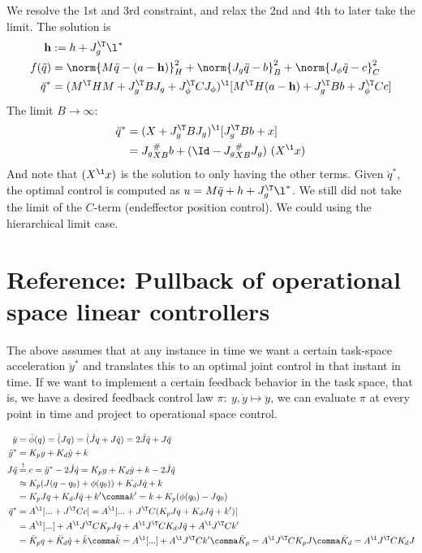 \documentclass[10pt,fleqn,twoside]{article}
\newcommand{\bh}{{\mathbf{h}}}
\begin{document}
We resolve the 1st and 3rd constraint, and relax the 2nd and 4th to
later take the limit. The solution is
\begin{align}
\bh
&:= h+J_g^\T\l^*  \\
f(\ddot q)
&=\norm{M\ddot q - (a-\bh)}^2_H
 + \norm{J_g \ddot q - b}^2_B
 + \norm{J_\phi \ddot q - c}^2_C \\
\ddot q^*
&= (M^\T H M + J_g^\T B J_g + J_\phi^\T C J_\phi)^\1 [ M^\T H (a-\bh) + J_g^\T B b + J_\phi^\T C c]
\end{align}
The limit $B\to\infty$:
\begin{align}
\ddot q^*
&= (X + J_g^\T B J_g)^\1 [ J_g^\T B b + x ] \\
&= J_g{}^\#_{XB} b + (\Id - J_g{}^\#_{XB} J_g)~ (X^\1 x)
\end{align}
And note that $(X^\1 x)$ is the solution to only having the other
terms.
Given $\ddot q^*$, the optimal control is computed as $u=M\ddot q + h
+ J_g^\T \l^*$. We still did not take the limit of the $C$-term
(endeffector position control). We could using the hierarchical limit
case.

\section{Reference: Pullback of operational space linear controllers}

The above assumes that at any instance in time we want a certain
task-space acceleration $\ddot y^*$ and translates this to an optimal
joint control in that instant in time. If we want to implement a
certain feedback behavior in the task space, that is, we have a
desired feedback control law $\pi:~ y,\dot y \mapsto \ddot y$, we can
evaluate $\pi$ at every point in time and project to operational space
control.

\begin{align}
\ddot y
 &= \ddot \phi(q) = \ddot (J q) = \dot (\dot J q + J \dot q) = 2 \dot J \dot q + J \ddot q \\
\ddot y^*
 &= K_p y + K_d \dot y + k \\
J \ddot q
 &\overset{!}= c = \ddot y^* - 2 \dot J \dot q
  = K_p y + K_d \dot y + k - 2 \dot J \dot q \\
 &\approx K_p (J(q-q_0)+\phi(q_0)) + K_d J \dot q + k \\
 &= K_p J q + K_d J \dot q + k' \comma k' = k + K_p (\phi(q_0)-J q_0) \\
\ddot q^*
 &= A^\1 [... + J^\T C c] = A^\1 [... + J^\T C (K_p J q + K_d J \dot q + k')] \\
 &= A^\1 [...] + A^\1 J^\T C K_p J q + A^\1 J^\T C K_d J \dot q + A^\1 J^\T C k' \\
 &= \bar K_p q + \bar K_d \dot q + \bar k \comma
\bar k =  A^\1 [...] + A^\1 J^\T C k'\comma \bar K_p = A^\1 J^\T C K_p
 J\comma \bar K_d = A^\1 J^\T C K_d J \label{eqProjGains}
\end{align}
\end{document}
